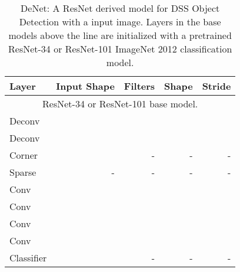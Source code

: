 \documentclass[10pt,twocolumn]{article}
\begin{document}
\begin{table}[tb] 
\begin{center}
\end{center}
\caption{Filter parameters used for DeNet models. See Table \ref{table:model_desc}}
\label{table:model_filters}

\begin{center}
\begin{tabular}{ l | r | r | r | r}
Layer & Input Shape &  Filters & Shape & Stride\\
\hline
\multicolumn{5}{c}{
ResNet-34 or ResNet-101\cite{resnet} base model.} \\
\hline
Deconv &  &  &  &  \\
Deconv &  &  &  &  \\
Corner &  & - & -  &- \\
Sparse & - & - &- & - \\ 
Conv  &  &  &   &  \\ 
Conv  &  &  &   &  \\ 
Conv &  &  &   &  \\ 
Conv  &  &  &   &  \\ 
Classifier &  & - & - & - \\
\end{tabular}
\end{center}
\caption{DeNet: A ResNet derived model for DSS Object Detection with a  input image. Layers in the base models above the line are initialized with a pretrained ResNet-34 or ResNet-101 ImageNet 2012 classification model.}
\label{table:model_desc}
\end{table}
\end{document}
